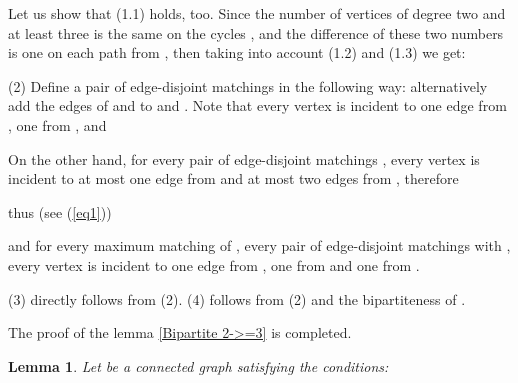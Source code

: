 \documentclass[fleqn,12pt,twoside]{article}
\newtheorem{lemma}{Lemma}
\newenvironment{proof}[1][Proof.]{\begin{trivlist}
\item[\hskip \labelsep {\bfseries #1}]}{\end{trivlist}}
\begin{document}
\begin{proof}
Let us show that (1.1) holds, too. Since the number of vertices of
degree two and at least three is the same on the cycles
, and the difference of these two numbers is one on
each path from ,
then taking into account (1.2) and (1.3) we get:

(2) Define a pair of edge-disjoint matchings  in
the following way: alternatively add the edges of  and  to  and . Note that every vertex  is incident to one edge from , one from , and

On the other hand, for every pair of edge-disjoint matchings
, every vertex  is incident to at
most one edge
from  and at most two edges from , therefore

thus (see (\ref{eq1}))

and for every maximum matching  of , every pair of
edge-disjoint matchings  with , every
vertex  is incident to one edge from , one from
 and one from .

(3) directly follows from (2). (4) follows from (2) and the
bipartiteness of .

The proof of the lemma \ref{Bipartite 2->=3} is completed.
\end{proof}


\begin{lemma}
\label{SystemInSubdivision}Let  be a connected graph satisfying
the conditions:
\end{lemma}
\end{document}
